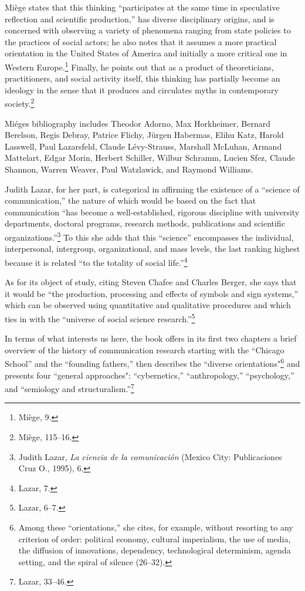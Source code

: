 \documentclass{tufte-handout}
\begin{document}
Miège states that this thinking ``participates at the same time in
speculative reflection and scientific production,'' has diverse
disciplinary origins, and is concerned with observing a variety of
phenomena ranging from state policies to the practices of social actors;
he also notes that it assumes a more practical orientation in the United
States of America and initially a more critical one in Western
Europe.\footnote{Miège, 9.} Finally, he points out that as a product of
theoreticians, practitioners, and social activity itself, this thinking
has partially become an ideology in the sense that it produces and
circulates myths in contemporary society.\footnote{Miège, 115--16.}

Miége\textquotesingle s bibliography includes Theodor Adorno, Max
Horkheimer, Bernard Berelson, Regis Debray, Patrice Flichy, Jürgen
Habermas, Elihu Katz, Harold Lasswell, Paul Lazarsfeld, Claude
Lévy-Strauss, Marshall McLuhan, Armand Mattelart, Edgar Morin, Herbert
Schiller, Wilbur Schramm, Lucien Sfez, Claude Shannon, Warren Weaver,
Paul Watzlawick, and Raymond Williams.

Judith Lazar, for her part, is categorical in affirming the existence of
a ``science of communication,'' the nature of which would be based on
the fact that communication ``has become a well-established, rigorous
discipline with university departments, doctoral programs, research
methods, publications and scientific organizations.''\footnote{Judith
  Lazar, \emph{La ciencia de la comunicación} (Mexico City:
  Publicaciones Cruz O., 1995), 6.} To this she adds that this
``science'' encompasses the individual, interpersonal, intergroup,
organizational, and mass levels, the last ranking highest because it is
related ``to the totality of social life.''\footnote{Lazar, 7.}

As for its object of study, citing Steven Chafee and Charles Berger, she
says that it would be ``the production, processing and effects of
symbols and sign systems,'' which can be observed using quantitative and
qualitative procedures and which ties in with the ``universe of social
science research.''\footnote{Lazar, 6--7.}

In terms of what interests us here, the book offers in its first two
chapters a brief overview of the history of communication research
starting with the ``Chicago School'' and the ``founding fathers,'' then\newpage\noindent
describes the ``diverse orientations"\footnote{Among these
  ``orientations,'' she cites, for example, without resorting to any
  criterion of order: political economy, cultural imperialism, the use
  of media, the diffusion of innovations, dependency, technological
  determinism, agenda setting, and the spiral of silence (26--32).} and
presents four ``general approaches": ``cybernetics,'' ``anthropology,''
``psychology,'' and ``semiology and structuralism.''\footnote{Lazar,
  33--46.}
\end{document}
